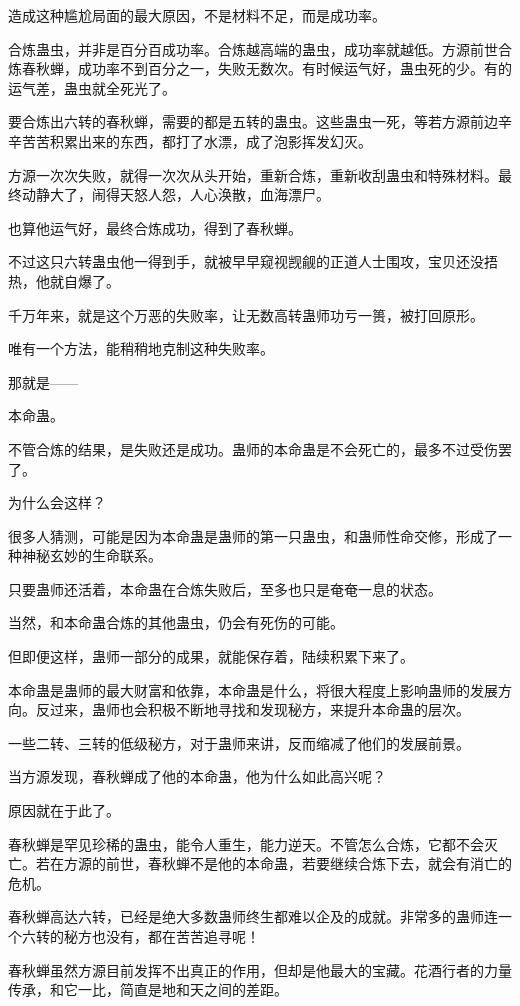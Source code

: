 \begin{this_body}
造成这种尴尬局面的最大原因，不是材料不足，而是成功率。

合炼蛊虫，并非是百分百成功率。合炼越高端的蛊虫，成功率就越低。方源前世合炼春秋蝉，成功率不到百分之一，失败无数次。有时候运气好，蛊虫死的少。有的运气差，蛊虫就全死光了。

要合炼出六转的春秋蝉，需要的都是五转的蛊虫。这些蛊虫一死，等若方源前边辛辛苦苦积累出来的东西，都打了水漂，成了泡影挥发幻灭。

方源一次次失败，就得一次次从头开始，重新合炼，重新收刮蛊虫和特殊材料。最终动静大了，闹得天怒人怨，人心涣散，血海漂尸。

也算他运气好，最终合炼成功，得到了春秋蝉。

不过这只六转蛊虫他一得到手，就被早早窥视觊觎的正道人士围攻，宝贝还没捂热，他就自爆了。

千万年来，就是这个万恶的失败率，让无数高转蛊师功亏一篑，被打回原形。

唯有一个方法，能稍稍地克制这种失败率。

那就是——

本命蛊。

不管合炼的结果，是失败还是成功。蛊师的本命蛊是不会死亡的，最多不过受伤罢了。

为什么会这样？

很多人猜测，可能是因为本命蛊是蛊师的第一只蛊虫，和蛊师性命交修，形成了一种神秘玄妙的生命联系。

只要蛊师还活着，本命蛊在合炼失败后，至多也只是奄奄一息的状态。

当然，和本命蛊合炼的其他蛊虫，仍会有死伤的可能。

但即便这样，蛊师一部分的成果，就能保存着，陆续积累下来了。

本命蛊是蛊师的最大财富和依靠，本命蛊是什么，将很大程度上影响蛊师的发展方向。反过来，蛊师也会积极不断地寻找和发现秘方，来提升本命蛊的层次。

一些二转、三转的低级秘方，对于蛊师来讲，反而缩减了他们的发展前景。

当方源发现，春秋蝉成了他的本命蛊，他为什么如此高兴呢？

原因就在于此了。

春秋蝉是罕见珍稀的蛊虫，能令人重生，能力逆天。不管怎么合炼，它都不会灭亡。若在方源的前世，春秋蝉不是他的本命蛊，若要继续合炼下去，就会有消亡的危机。

春秋蝉高达六转，已经是绝大多数蛊师终生都难以企及的成就。非常多的蛊师连一个六转的秘方也没有，都在苦苦追寻呢！

春秋蝉虽然方源目前发挥不出真正的作用，但却是他最大的宝藏。花酒行者的力量传承，和它一比，简直是地和天之间的差距。

\end{this_body}

